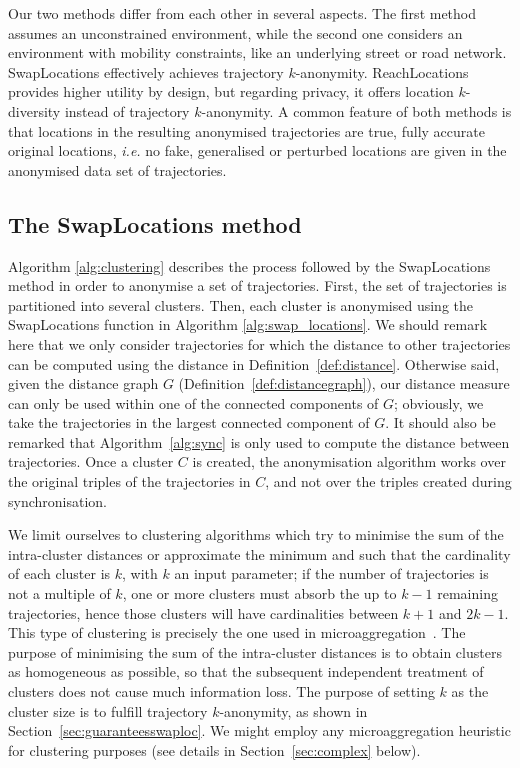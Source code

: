 Our two methods differ from each other in several aspects.
The first method assumes an unconstrained environment, while
the second one considers an environment with mobility constraints,
like an underlying street or road network.
SwapLocations effectively achieves trajectory $k$-anonymity.
ReachLocations provides higher utility by design, but regarding
privacy, it offers location $k$-diversity instead of
trajectory $k$-anonymity. A common feature of both methods
is that locations in the resulting anonymised trajectories
are true, fully accurate original locations,
{\em i.e.} no fake, generalised or perturbed locations are
given in the anonymised data set of trajectories.

\subsection{The SwapLocations method}
\label{swaploc}

Algorithm \ref{alg:clustering} describes the process
followed by the SwapLocations method in order to anonymise
a set of trajectories. First, the set of trajectories
is partitioned into several clusters.
Then, each cluster is anonymised
using the SwapLocations function in Algorithm \ref{alg:swap_locations}.
We should remark here that we only consider trajectories
for which the distance to other trajectories can be computed
using the distance in Definition~\ref{def:distance}. Otherwise said,
given the distance graph $G$ (Definition~\ref{def:distancegraph}),
our distance
measure can only be used within one of the connected components of $G$;
obviously, we take the trajectories in the largest connected component
of $G$.
It should also be remarked that Algorithm~\ref{alg:sync} is only used
to compute the distance between trajectories. Once a cluster $C$
is created, the anonymisation algorithm works over the original
triples of the trajectories in $C$, and not over the triples created
during synchronisation.

We limit ourselves to clustering algorithms which
try to minimise the sum of the intra-cluster distances or approximate
the minimum and such that the cardinality of each cluster
is $k$, with $k$ an input parameter; if the number of trajectories
is not a multiple of $k$, one or more clusters must absorb the
up to $k-1$ remaining trajectories, hence those clusters will have
cardinalities between $k+1$ and $2k-1$.
This type of clustering is precisely the one used in
microaggregation~\cite{domingo02}.
The purpose of minimising the sum of the intra-cluster distances
is to obtain clusters as homogeneous as possible, so that the subsequent
independent treatment of clusters does not cause much information loss.
The purpose of setting $k$ as the cluster size
is to fulfill trajectory $k$-anonymity, as shown in
Section~\ref{sec:guaranteesswaploc}.
We might employ any microaggregation heuristic for clustering
purposes (see details in Section~\ref{sec:complex} below).


